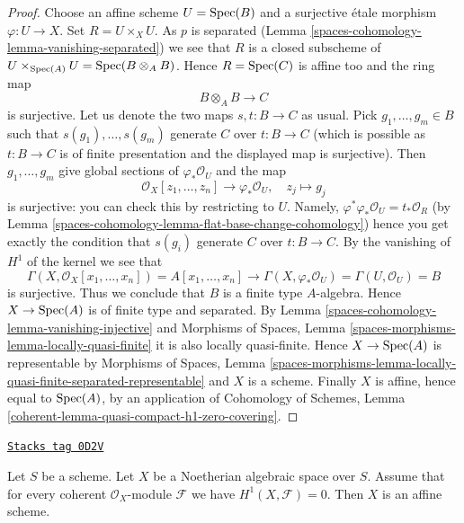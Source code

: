 \begin{proof}
Choose an affine scheme $U = \operatorname{Spec}(B)$ and a surjective \'etale
morphism $\varphi : U \to X$. Set $R = U \times_X U$. As $p$ is separated
(Lemma \ref{spaces-cohomology-lemma-vanishing-separated}) we see that $R$ is a
closed subscheme of $U \times_{\operatorname{Spec}(A)} U = \operatorname{Spec}(B \otimes_A B)$.
Hence $R = \operatorname{Spec}(C)$ is affine too and the ring map
$$
B \otimes_A B \longrightarrow C
$$
is surjective. Let us denote the two maps $s, t : B \to C$ as usual. Pick
$g_1, \ldots, g_m \in B$ such that $s(g_1), \ldots, s(g_m)$ generate $C$
over $t : B \to C$ (which is possible as $t : B \to C$ is of finite
presentation and the displayed map is surjective). Then $g_1, \ldots, g_m$
give global sections of $\varphi_*\mathcal{O}_U$ and the map
$$
\mathcal{O}_X[z_1, \ldots, z_n] \longrightarrow \varphi_*\mathcal{O}_U,
\quad
z_j \longmapsto g_j
$$
is surjective: you can check this by restricting to $U$.
Namely, $\varphi^*\varphi_*\mathcal{O}_U = t_*\mathcal{O}_R$
(by Lemma \ref{spaces-cohomology-lemma-flat-base-change-cohomology})
hence you get exactly the condition that $s(g_i)$ generate $C$
over $t : B \to C$. By the vanishing of $H^1$ of the kernel we see that
$$
\Gamma(X, \mathcal{O}_X[x_1, \ldots, x_n]) =
A[x_1, \ldots, x_n] \longrightarrow
\Gamma(X, \varphi_*\mathcal{O}_U) = \Gamma(U, \mathcal{O}_U) = B
$$
is surjective. Thus we conclude that $B$ is a finite type $A$-algebra.
Hence $X \to \operatorname{Spec}(A)$ is of finite type and separated.
By Lemma \ref{spaces-cohomology-lemma-vanishing-injective}
and
Morphisms of Spaces, Lemma \ref{spaces-morphisms-lemma-locally-quasi-finite}
it is also locally quasi-finite. Hence $X \to \operatorname{Spec}(A)$ is representable by
Morphisms of Spaces, Lemma
\ref{spaces-morphisms-lemma-locally-quasi-finite-separated-representable}
and $X$ is a scheme. Finally $X$ is affine, hence equal to $\operatorname{Spec}(A)$,
by an application of Cohomology of Schemes, Lemma
\ref{coherent-lemma-quasi-compact-h1-zero-covering}.
\end{proof}

\begin{lemma}
\label{spaces-cohomology-lemma-Noetherian-h1-zero}
\href{https://stacks.math.columbia.edu/tag/0D2V}{\texttt{Stacks tag 0D2V}}

Let $S$ be a scheme. Let $X$ be a Noetherian algebraic space over $S$.
Assume that for every coherent $\mathcal{O}_X$-module
$\mathcal{F}$ we have $H^1(X, \mathcal{F}) = 0$.
Then $X$ is an affine scheme.
\end{lemma}

